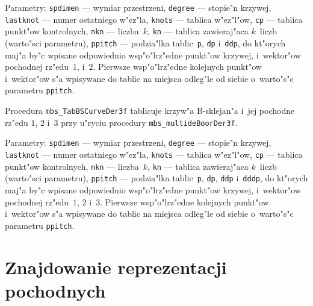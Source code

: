 \begin{sloppypar}
Parametry: \texttt{spdimen} --- wymiar
przestrzeni, \texttt{degree} --- stopie"n krzywej,
\texttt{lastknot} --- numer ostatniego w"ez"la,
\texttt{knots} --- tablica w"ez"l"ow, \texttt{cp} --- tablica
punkt"ow kontrolnych, \texttt{nkn} --- liczba~$k$, \texttt{kn} --- tablica
zawieraj"aca $k$~liczb (warto"sci parametru), \texttt{ppitch} --- podzia"lka
tablic~\texttt{p}, \texttt{dp} i~\texttt{ddp}, do kt"orych maj"a by"c wpisane
odpowiednio wsp"o"lrz"edne punkt"ow krzywej, i~wektor"ow pochodnej
rz"edu~$1$, i~$2$. Pierwsze wsp"o"lrz"edne kolejnych punkt"ow i~wektor"ow
s"a wpisywane do tablic na miejsca odleg"le od siebie o~warto"s"c parametru
\texttt{ppitch}.%
\end{sloppypar}

\vspace{\bigskipamount}
Procedura \texttt{mbs\_TabBSCurveDer3f} tablicuje krzyw"a B-sklejan"a
i~jej pochodne rz"e\-du $1$, $2$ i~$3$ przy u"ryciu procedury
\texttt{mbs\_multideBoorDer3f}.

\begin{sloppypar}
Parametry: \texttt{spdimen} --- wymiar
przestrzeni, \texttt{degree} --- stopie"n krzywej,
\texttt{lastknot} --- numer ostatniego w"ez"la,
\texttt{knots} --- tablica w"ez"l"ow, \texttt{cp} --- tablica
punkt"ow kontrolnych, \texttt{nkn} --- liczba~$k$, \texttt{kn} --- tablica
zawieraj"aca $k$~liczb (warto"sci parametru), \texttt{ppitch} --- podzia"lka
tablic~\texttt{p}, \texttt{dp}, \texttt{ddp} i~\texttt{dddp}, do kt"orych
maj"a by"c wpisane odpowiednio wsp"o"lrz"edne punkt"ow krzywej, i~wektor"ow
pochodnej rz"edu~$1$, $2$ i~$3$. Pierwsze wsp"o"lrz"edne kolejnych punkt"ow
i~wektor"ow s"a wpisywane do tablic na miejsca odleg"le od siebie o~warto"s"c
parametru \texttt{ppitch}.%
\end{sloppypar}


\newpage
\section{Znajdowanie reprezentacji pochodnych}

